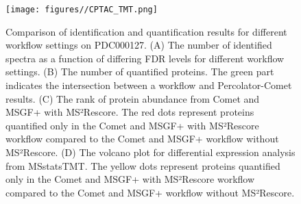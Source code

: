 \documentclass[12pt]{article}
\begin{document}
\begin{figure}[ht!]
	\centering
	\texttt{[image: figures//CPTAC\_TMT.png]}
	\caption{Comparison of identification and quantification results for different workflow settings on PDC000127. (A) The number of identified spectra as a function of differing FDR levels for different workflow settings. (B) The number of quantified proteins. The green part indicates the intersection between a workflow and Percolator-Comet results. (C) The rank of protein abundance from Comet and MSGF+ with MS²Rescore. The red dots represent proteins quantified only in the Comet and MSGF+ with MS²Rescore workflow compared to the Comet and MSGF+ workflow without MS²Rescore. (D) The volcano plot for differential expression analysis from MSstatsTMT. The yellow dots represent proteins quantified only in the Comet and MSGF+ with MS²Rescore workflow compared to the Comet and MSGF+ workflow without MS²Rescore.} %
	\label{fig:PDC_ms2rescore}
\end{figure}



\end{document}
